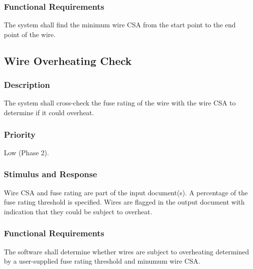 \subsubsection{Functional Requirements}
The system shall find the minimum wire CSA from the start point to the end point of the wire.

  \subsection{Wire Overheating Check}
\subsubsection{Description}
The system shall cross-check the fuse rating of the wire with the wire CSA to determine if it could overheat.

\subsubsection{Priority}
Low (Phase 2).

\subsubsection{Stimulus and Response}
Wire CSA and fuse rating are part of the input document(s). A percentage of the fuse rating threshold is specified. Wires are flagged in the output document with indication that they could be subject to overheat.

\subsubsection{Functional Requirements}
The software shall determine whether wires are subject to overheating determined by a user-supplied fuse rating threshold and minumum wire CSA.




 
 

